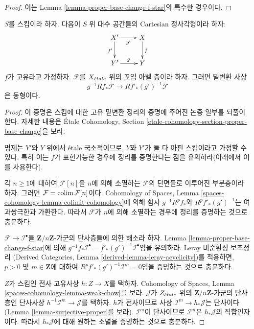 \begin{proof}
이는 Lemma \ref{lemma-proper-base-change-f-star}의 특수한 경우이다.
\end{proof}

\begin{theorem}
\label{theorem-proper-base-change}
$S$를 스킴이라 하자. 다음이 $S$ 위 대수 공간들의 Cartesian
정사각형이라 하자:
$$
\xymatrix{
X' \ar[r]_{g'} \ar[d]_{f'} & X \ar[d]^f \\
Y' \ar[r]^g & Y
}
$$
$f$가 고유라고 가정하자.
$\mathcal{F}$를 $X_{\acute{e}tale}$ 위의 꼬임 아벨 층이라 하자.
그러면 밑변환 사상
$$
g^{-1}Rf_*\mathcal{F} \longrightarrow Rf'_*(g')^{-1}\mathcal{F}
$$
은 동형이다.
\end{theorem}

\begin{proof}
이 증명은 스킴에 대한 고유 밑변환 정리의 증명에 주어진
논증 일부를 되풀이한다. 자세한 내용은
\'Etale Cohomology, Section
\ref{etale-cohomology-section-proper-base-change}을 보라.

\medskip\noindent
명제는 $Y'$와 $Y$ 위에서 \'etale 국소적이므로, $Y$와 $Y'$가 둘 다
아핀 스킴이라고 가정할 수 있다. 특히 이는 $f$가 표현가능한 경우에
정리를 증명한다는 점을 유의하라(아래에서 이를 사용한다).

\medskip\noindent
각 $n \geq 1$에 대하여 $\mathcal{F}[n]$을 $n$에 의해 소멸하는
$\mathcal{F}$의 단면들로 이루어진 부분층이라 하자. 그러면
$\mathcal{F} = \mathop{\mathrm{colim}}\nolimits \mathcal{F}[n]$이다.
Cohomology of Spaces, Lemma
\ref{spaces-cohomology-lemma-colimit-cohomology}에 의해 함자
$g^{-1}R^pf_*$와 $R^pf'_*(g')^{-1}$는 여과쌍극한과 가환한다.
따라서 $\mathcal{F}$가 $n$에 의해 소멸하는 경우에 정리를
증명하는 것으로 충분하다.

\medskip\noindent
$\mathcal{F} \to \mathcal{I}^\bullet$을
$\mathbf{Z}/n\mathbf{Z}$-가군의 단사층들에 의한 해소라 하자.
Lemma \ref{lemma-proper-base-change-f-star}에 의해
$g^{-1}f_*\mathcal{I}^\bullet = f'_*(g')^{-1}\mathcal{I}^\bullet$임을
유의하라. Leray 비순환성 보조정리
(Derived Categories, Lemma \ref{derived-lemma-leray-acyclicity})를
적용하면, $p > 0$ 및 $m \in \mathbf{Z}$에 대하여
$R^pf'_*(g')^{-1}\mathcal{I}^m = 0$임을 증명하는 것으로 충분하다.

\medskip\noindent
$Z$가 스킴인 전사 고유사상 $h : Z \to X$를 택하자.
Cohomology of Spaces, Lemma
\ref{spaces-cohomology-lemma-weak-chow}를 보라.
$\mathcal{J}$가 $Z_{\acute{e}tale}$ 위의
$\mathbf{Z}/n\mathbf{Z}$-가군의 단사층인 단사사상
$h^{-1}\mathcal{I}^m \to \mathcal{J}$를 택하자.
$h$가 전사이므로 사상 $\mathcal{I}^m \to h_*\mathcal{J}$는
단사이다(Lemma \ref{lemma-surjective-proper}를 보라).
$\mathcal{I}^m$이 단사이므로 $\mathcal{I}^m$은
$h_*\mathcal{J}$의 직합인자이다. 따라서
$h_*\mathcal{J}$에 대해 원하는 소멸을 증명하는 것으로 충분하다.


\end{proof}
